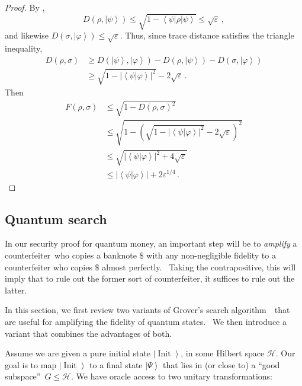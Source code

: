 \begin{proof}
By ,%
\[
D\left(  \rho,\left\vert \psi\right\rangle \right)  \leq\sqrt{1-\left\langle
\psi\right\vert \rho\left\vert \psi\right\rangle }\leq\sqrt{\varepsilon}\,,
\]
and likewise $D\left(  \sigma,\left\vert \varphi\right\rangle \right)
\leq\sqrt{\varepsilon}$. Thus, since trace distance satisfies the triangle
inequality,%
\begin{align*}
D\left(  \rho,\sigma\right)   &  \geq D\left(  \left\vert \psi\right\rangle
,\left\vert \varphi\right\rangle \right)  -D\left(  \rho,\left\vert
\psi\right\rangle \right)  -D\left(  \sigma,\left\vert \varphi\right\rangle
\right)  \\
&  \geq\sqrt{1-\left\vert \left\langle \psi|\varphi\right\rangle \right\vert
^{2}}-2\sqrt{\varepsilon}\,.
\end{align*}
Then%
\begin{align*}
F\left(  \rho,\sigma\right)   &  \leq\sqrt{1-D\left(  \rho,\sigma\right)
^{2}}\\
&  \leq\sqrt{1-\left(  \sqrt{1-\left\vert \left\langle \psi|\varphi
\right\rangle \right\vert ^{2}}-2\sqrt{\varepsilon}\right)  ^{2}}\\
&  \leq\sqrt{\left\vert \left\langle \psi|\varphi\right\rangle \right\vert
^{2}+4\sqrt{\varepsilon}}\\[1ex]
&  \leq\left\vert \left\langle \psi|\varphi\right\rangle \right\vert
+2\varepsilon^{1/4}\,.
\end{align*}

\end{proof}

\subsection{Quantum search\label{SEARCH}}

In our security proof for quantum money, an important step will be to
\emph{amplify} a counterfeiter\ who copies a banknote $\$$ with any
non-negligible fidelity to a counterfeiter who copies $\$$ almost perfectly.
\ Taking the contrapositive, this will imply that to rule out the former sort
of counterfeiter, it suffices to rule out the latter.

In this section, we first review two variants of Grover's search algorithm~\cite{grover}\ that are useful for amplifying the fidelity of quantum states.
\ We then introduce a variant that combines the advantages of both.

Assume we are given a pure initial state $\left\vert \operatorname*{Init}%
\right\rangle $, in some Hilbert space $\mathcal{H}$. Our goal is to map
$\left\vert \operatorname*{Init}\right\rangle $ to a final state $\left\vert
\Psi\right\rangle $ that lies in (or close to) a \textquotedblleft good
subspace\textquotedblright\ $G\leq\mathcal{H}$. We have oracle access to two
unitary transformations:

